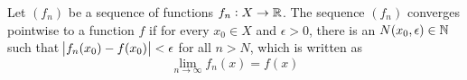 \begin{definition}
    Let $(f_n)$ be a sequence of functions $f_n : X \rightarrow \mathbb{R}$. The sequence $(f_n)$ converges pointwise to a function $f$ if for every $x_0 \in X$ and $\epsilon > 0$, there is an $N(x_0, \epsilon) \in \mathbb{N}$ such that $\abs{f_n (x_0) - f(x_0)} < \epsilon$ for all $n > N$, which is written as
    \begin{equation}
        \lim_{n \rightarrow \infty} f_n (x) = f(x)
    \end{equation}
\end{definition}




























































































